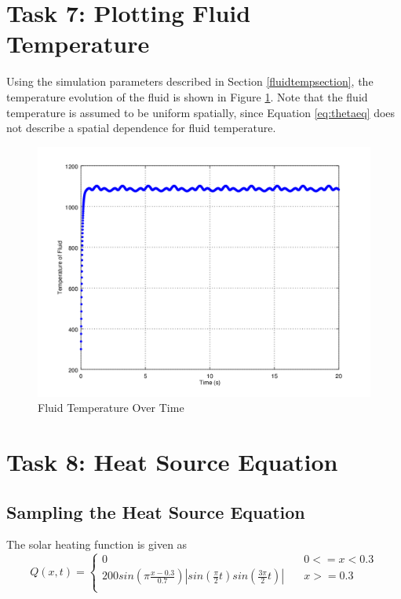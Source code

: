 \documentclass[12pt]{amsart}
\begin{document}
\section{Task 7: Plotting Fluid Temperature}
Using the simulation parameters described in Section \ref{fluidtempsection}, the temperature evolution of the fluid is shown in Figure \ref{fig:fluidtemp}. Note that the fluid temperature is assumed to be uniform spatially, since Equation \ref{eq:thetaeq} does not describe a spatial dependence for fluid temperature. 

\begin{center}
\begin{figure}
\includegraphics[scale=0.7]{task6fig}
\caption{Fluid Temperature Over Time}
\label{fig:fluidtemp}
\end{figure}
\end{center}


\section{Task 8: Heat Source Equation}
\subsection{Sampling the Heat Source Equation}
The solar heating function is given as
\[ Q(x,t) =
  \begin{cases}
    0       & \quad 0 <= x < 0.3\\
    200 sin(\pi \frac{x-0.3}{0.7}) | sin(\frac{\pi}{2} t) sin(\frac{3\pi}{2} t) |  & \quad x >= 0.3\\
  \end{cases}
\]
\end{document}
